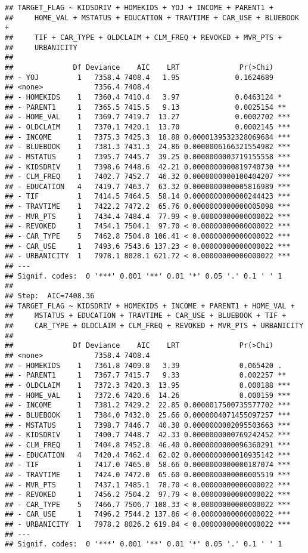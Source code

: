 \documentclass[
]{article}
\begin{document}
\begin{verbatim}
## TARGET_FLAG ~ KIDSDRIV + HOMEKIDS + YOJ + INCOME + PARENT1 + 
##     HOME_VAL + MSTATUS + EDUCATION + TRAVTIME + CAR_USE + BLUEBOOK + 
##     TIF + CAR_TYPE + OLDCLAIM + CLM_FREQ + REVOKED + MVR_PTS + 
##     URBANICITY
## 
##              Df Deviance    AIC    LRT              Pr(>Chi)    
## - YOJ         1   7358.4 7408.4   1.95             0.1624689    
## <none>            7356.4 7408.4                                 
## - HOMEKIDS    1   7360.4 7410.4   3.97             0.0463124 *  
## - PARENT1     1   7365.5 7415.5   9.13             0.0025154 ** 
## - HOME_VAL    1   7369.7 7419.7  13.27             0.0002702 ***
## - OLDCLAIM    1   7370.1 7420.1  13.70             0.0002145 ***
## - INCOME      1   7375.3 7425.3  18.88 0.0000139532328069684 ***
## - BLUEBOOK    1   7381.3 7431.3  24.86 0.0000006166321554982 ***
## - MSTATUS     1   7395.7 7445.7  39.25 0.0000000003719155558 ***
## - KIDSDRIV    1   7398.6 7448.6  42.21 0.0000000000819740730 ***
## - CLM_FREQ    1   7402.7 7452.7  46.32 0.0000000000100404207 ***
## - EDUCATION   4   7419.7 7463.7  63.32 0.0000000000005816989 ***
## - TIF         1   7414.5 7464.5  58.14 0.0000000000000244423 ***
## - TRAVTIME    1   7422.2 7472.2  65.76 0.0000000000000005098 ***
## - MVR_PTS     1   7434.4 7484.4  77.99 < 0.00000000000000022 ***
## - REVOKED     1   7454.1 7504.1  97.70 < 0.00000000000000022 ***
## - CAR_TYPE    5   7462.8 7504.8 106.41 < 0.00000000000000022 ***
## - CAR_USE     1   7493.6 7543.6 137.23 < 0.00000000000000022 ***
## - URBANICITY  1   7978.1 8028.1 621.72 < 0.00000000000000022 ***
## ---
## Signif. codes:  0 '***' 0.001 '**' 0.01 '*' 0.05 '.' 0.1 ' ' 1
## 
## Step:  AIC=7408.36
## TARGET_FLAG ~ KIDSDRIV + HOMEKIDS + INCOME + PARENT1 + HOME_VAL + 
##     MSTATUS + EDUCATION + TRAVTIME + CAR_USE + BLUEBOOK + TIF + 
##     CAR_TYPE + OLDCLAIM + CLM_FREQ + REVOKED + MVR_PTS + URBANICITY
## 
##              Df Deviance    AIC    LRT              Pr(>Chi)    
## <none>            7358.4 7408.4                                 
## - HOMEKIDS    1   7361.8 7409.8   3.39              0.065420 .  
## - PARENT1     1   7367.7 7415.7   9.33              0.002257 ** 
## - OLDCLAIM    1   7372.3 7420.3  13.95              0.000188 ***
## - HOME_VAL    1   7372.6 7420.6  14.26              0.000159 ***
## - INCOME      1   7381.2 7429.2  22.85 0.0000017500735577702 ***
## - BLUEBOOK    1   7384.0 7432.0  25.66 0.0000004071455097257 ***
## - MSTATUS     1   7398.7 7446.7  40.38 0.0000000002095503663 ***
## - KIDSDRIV    1   7400.7 7448.7  42.33 0.0000000000769242452 ***
## - CLM_FREQ    1   7404.8 7452.8  46.40 0.0000000000096360291 ***
## - EDUCATION   4   7420.4 7462.4  62.02 0.0000000000010935142 ***
## - TIF         1   7417.0 7465.0  58.66 0.0000000000000187074 ***
## - TRAVTIME    1   7424.0 7472.0  65.60 0.0000000000000005519 ***
## - MVR_PTS     1   7437.1 7485.1  78.70 < 0.00000000000000022 ***
## - REVOKED     1   7456.2 7504.2  97.79 < 0.00000000000000022 ***
## - CAR_TYPE    5   7466.7 7506.7 108.33 < 0.00000000000000022 ***
## - CAR_USE     1   7496.2 7544.2 137.86 < 0.00000000000000022 ***
## - URBANICITY  1   7978.2 8026.2 619.84 < 0.00000000000000022 ***
## ---
## Signif. codes:  0 '***' 0.001 '**' 0.01 '*' 0.05 '.' 0.1 ' ' 1
\end{verbatim}
\end{document}
